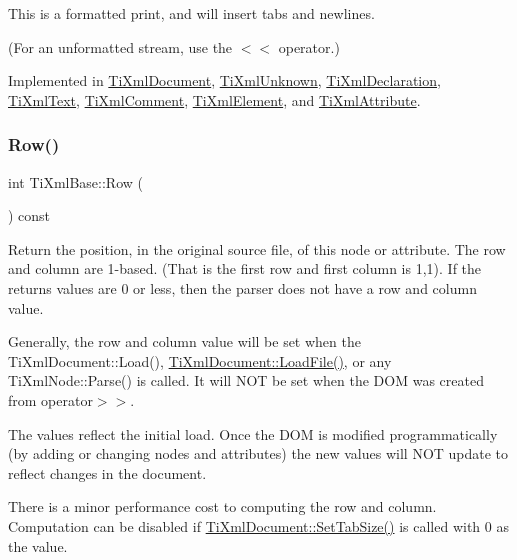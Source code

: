 This is a formatted print, and will insert tabs and newlines.

(For an unformatted stream, use the $<$$<$ operator.) 

Implemented in \hyperlink{classTiXmlDocument_aa9e166fae51da603641380a964f21eeb}{Ti\+Xml\+Document}, \hyperlink{classTiXmlUnknown_a5793fbc48ab3419783c0e866ca2d334e}{Ti\+Xml\+Unknown}, \hyperlink{classTiXmlDeclaration_ae46cff6565f299210ab945e78bf28514}{Ti\+Xml\+Declaration}, \hyperlink{classTiXmlText_a75f6895906333894e2574cc8cf77ea79}{Ti\+Xml\+Text}, \hyperlink{classTiXmlComment_a873171beac19d40f0eaae945711c98ed}{Ti\+Xml\+Comment}, \hyperlink{classTiXmlElement_aa31a15cddfb8601a31236fe7d2569fb4}{Ti\+Xml\+Element}, and \hyperlink{classTiXmlAttribute_a68ae373e03b9c35be4c9d0c3c233b894}{Ti\+Xml\+Attribute}.

\mbox{\label{classTiXmlBase_ad0cacca5d76d156b26511f46080b442e}} 
\subsubsection{\texorpdfstring{Row()}{Row()}}
{\footnotesize\ttfamily int Ti\+Xml\+Base\+::\+Row (\begin{DoxyParamCaption}{ }\end{DoxyParamCaption}) const\hspace{0.3cm}{\ttfamily [inline]}}

Return the position, in the original source file, of this node or attribute. The row and column are 1-\/based. (That is the first row and first column is 1,1). If the returns values are 0 or less, then the parser does not have a row and column value.

Generally, the row and column value will be set when the Ti\+Xml\+Document\+::\+Load(), \hyperlink{classTiXmlDocument_a4c852a889c02cf251117fd1d9fe1845f}{Ti\+Xml\+Document\+::\+Load\+File()}, or any Ti\+Xml\+Node\+::\+Parse() is called. It will N\+OT be set when the D\+OM was created from operator$>$$>$.

The values reflect the initial load. Once the D\+OM is modified programmatically (by adding or changing nodes and attributes) the new values will N\+OT update to reflect changes in the document.

There is a minor performance cost to computing the row and column. Computation can be disabled if \hyperlink{classTiXmlDocument_a51dac56316f89b35bdb7d0d433ba988e}{Ti\+Xml\+Document\+::\+Set\+Tab\+Size()} is called with 0 as the value.


